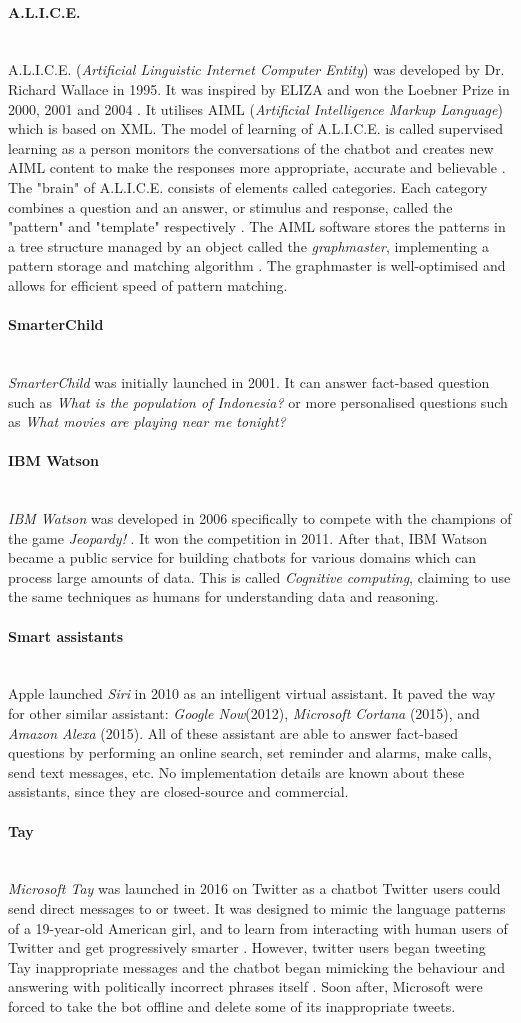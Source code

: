 \documentclass[12pt,a4paper]{article}
\newcommand{\myparagraph}[1]{\paragraph{#1}\mbox{}\\} %
\begin{document}
\myparagraph{A.L.I.C.E.}
A.L.I.C.E. (\textit{Artificial Linguistic Internet Computer Entity}) was developed by Dr. Richard Wallace in 1995. It was inspired by ELIZA and won the Loebner Prize in 2000, 2001 and 2004 \cite[p.~182]{Wallace2009}. It utilises AIML (\textit{Artificial Intelligence Markup Language}) which is based on XML. The model of learning of A.L.I.C.E. is called supervised learning as a person monitors the conversations of the chatbot and creates new AIML content to make the responses more appropriate, accurate and believable \cite[p.~182]{Wallace2009}. The "brain" of A.L.I.C.E. consists of elements called categories. Each category combines a question and an answer, or stimulus and response, called the "pattern" and "template" respectively \cite[p.~182]{Wallace2009}.  The AIML software stores the patterns in a
tree structure managed by an object called the \textit{graphmaster}, implementing a pattern storage and matching algorithm \cite[p.~182]{Wallace2009}. The graphmaster is well-optimised and allows for efficient speed of pattern matching.

\myparagraph{SmarterChild}
\textit{SmarterChild} was initially launched in 2001. It can answer fact-based question such as \textit{What is the population of Indonesia?} or more personalised questions such as \textit{What movies are playing near me tonight?} \cite{SmarterChild:online}

\myparagraph{IBM Watson}
\textit{IBM Watson} was developed in 2006 specifically to compete with the champions of the game \textit{Jeopardy!} \cite{futurism:online}. It won the competition in 2011. After that, IBM Watson became a public service for building chatbots for various domains which can process large amounts of data. This is called \textit{Cognitive computing}, claiming to use the same techniques as humans for understanding data and reasoning.

\myparagraph{Smart assistants}
Apple launched \textit{Siri} in 2010 as an intelligent virtual assistant. It paved the way for other similar assistant: \textit{Google Now}(2012), \textit{Microsoft Cortana} (2015), and \textit{Amazon Alexa} (2015). All of these assistant are able to answer fact-based questions by performing an online search, set reminder and alarms, make calls, send text messages, etc.
No implementation details are known about these assistants, since they are closed-source and commercial.

\myparagraph{Tay}
\textit{Microsoft Tay} was launched in 2016 \cite{Taytweet55:online} on Twitter as a chatbot Twitter users could send direct messages to or tweet. It was designed to mimic the language patterns of a 19-year-old American girl, and to learn from interacting with human users of Twitter and get progressively smarter \cite{Microsof8:online}. However, twitter users began tweeting Tay inappropriate messages and the chatbot began mimicking the behaviour and answering with politically incorrect phrases itself \cite{Microsof8:online}. Soon after, Microsoft were forced to take the bot offline and delete some of its inappropriate tweets.
\end{document}
